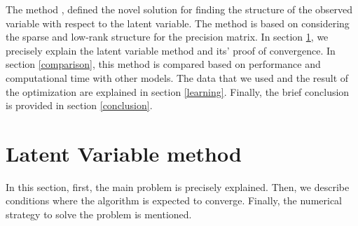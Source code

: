 \documentclass[10pt,conference]{IEEEtran}
\begin{document}
The method \cite{Chandra_1}, defined the novel solution for finding the structure of the observed variable with respect to the latent variable. The method is based on considering the sparse and low-rank structure for the precision matrix. In section \ref{laten}, we precisely explain the latent variable method \cite{Chandra_1} and its' proof of convergence. In section \ref{comparison},   this method \cite{Chandra_1} is compared based on performance and computational time with other models. The data that we used and the result of the optimization are explained in section \ref{learning}. Finally, the brief conclusion is provided in section \ref{conclusion}.

\section{Latent Variable method} \label{laten}
In this section, first, the main problem is precisely explained. Then, we describe conditions where the algorithm is expected to converge. Finally, the numerical strategy to solve the problem is mentioned.
\end{document}
